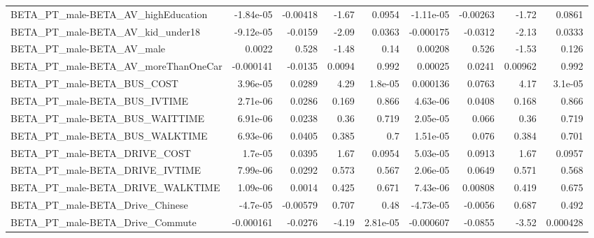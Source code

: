 \begin{tabular}{lrrrrrrrr}
BETA\_PT\_male-BETA\_AV\_highEducation                 &   -1.84e-05 &     -0.00418 &    -1.67 &   0.0954 &  -1.11e-05 &    -0.00263 &        -1.72 &        0.0861 \\
BETA\_PT\_male-BETA\_AV\_kid\_under18                   &   -9.12e-05 &      -0.0159 &    -2.09 &   0.0363 &  -0.000175 &     -0.0312 &        -2.13 &        0.0333 \\
BETA\_PT\_male-BETA\_AV\_male                          &      0.0022 &        0.528 &    -1.48 &     0.14 &    0.00208 &       0.526 &        -1.53 &         0.126 \\
BETA\_PT\_male-BETA\_AV\_moreThanOneCar                &   -0.000141 &      -0.0135 &   0.0094 &    0.992 &    0.00025 &      0.0241 &      0.00962 &         0.992 \\
BETA\_PT\_male-BETA\_BUS\_COST                         &    3.96e-05 &       0.0289 &     4.29 &  1.8e-05 &   0.000136 &      0.0763 &         4.17 &       3.1e-05 \\
BETA\_PT\_male-BETA\_BUS\_IVTIME                       &    2.71e-06 &       0.0286 &    0.169 &    0.866 &   4.63e-06 &      0.0408 &        0.168 &         0.866 \\
BETA\_PT\_male-BETA\_BUS\_WAITTIME                     &    6.91e-06 &       0.0238 &     0.36 &    0.719 &   2.05e-05 &       0.066 &         0.36 &         0.719 \\
BETA\_PT\_male-BETA\_BUS\_WALKTIME                     &    6.93e-06 &       0.0405 &    0.385 &      0.7 &   1.51e-05 &       0.076 &        0.384 &         0.701 \\
BETA\_PT\_male-BETA\_DRIVE\_COST                       &     1.7e-05 &       0.0395 &     1.67 &   0.0954 &   5.03e-05 &      0.0913 &         1.67 &        0.0957 \\
BETA\_PT\_male-BETA\_DRIVE\_IVTIME                     &    7.99e-06 &       0.0292 &    0.573 &    0.567 &   2.06e-05 &      0.0649 &        0.571 &         0.568 \\
BETA\_PT\_male-BETA\_DRIVE\_WALKTIME                   &    1.09e-06 &       0.0014 &    0.425 &    0.671 &   7.43e-06 &     0.00808 &        0.419 &         0.675 \\
BETA\_PT\_male-BETA\_Drive\_Chinese                    &    -4.7e-05 &     -0.00579 &    0.707 &     0.48 &  -4.73e-05 &     -0.0056 &        0.687 &         0.492 \\
BETA\_PT\_male-BETA\_Drive\_Commute                    &   -0.000161 &      -0.0276 &    -4.19 & 2.81e-05 &  -0.000607 &     -0.0855 &        -3.52 &      0.000428 \\

\end{tabular}
